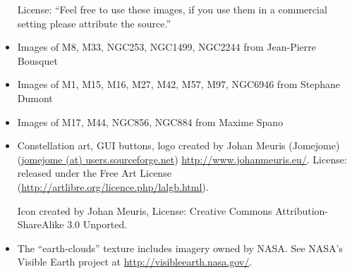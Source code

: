 \begin{itemize}
	  License: ``Feel free to use these images, if you use them in a commercial setting please attribute the source.''
\item Images of M8, M33, NGC253, NGC1499, NGC2244 from Jean-Pierre Bousquet
\item Images of M1, M15, M16, M27, M42, M57, M97, NGC6946 from Stephane Dumont
\item Images of M17, M44, NGC856, NGC884 from Maxime Spano
\item Constellation art, GUI buttons, logo created by Johan Meuris (Jomejome) (\url{jomejome (at) users.sourceforge.net})
	  \url{http://www.johanmeuris.eu/}.
	  License: released under the Free Art License (\url{http://artlibre.org/licence.php/lalgb.html}).
		 
	  Icon created by Johan Meuris, License: Creative Commons Attribution-ShareAlike 3.0 Unported.
\item The ``earth-clouds'' texture includes imagery owned by NASA.
	  See NASA's Visible Earth project at \url{http://visibleearth.nasa.gov/}.


\end{itemize}
